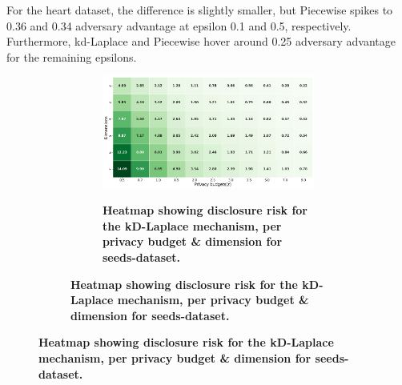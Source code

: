 For the heart dataset, the difference is slightly smaller, but Piecewise spikes to 0.36 and 0.34 adversary advantage at epsilon 0.1 and 0.5, respectively. Furthermore, kd-Laplace and Piecewise hover around 0.25 adversary advantage for the remaining epsilons.
\newpage
\begin{figure}[H]
    \centering
    \begin{subfigure}[b]{0.85\textwidth}
        \begin{subfigure}[c]{1\textwidth}
            \caption{\textbf{Heatmap showing disclosure risk for the kD-Laplace mechanism, per privacy budget \& dimension for seeds-dataset.}}
            \includegraphics[width=1\textwidth]{Results/kd-laplace/kd-Laplace/seeds-dataset/distance.png}
            \label{fig:privacy_dist_seeds-dataset_adversial_advantage_kd-laplace}
        \end{subfigure}
        \vfill %


\end{subfigure}
\end{figure}
